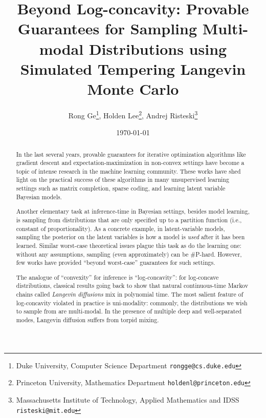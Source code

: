 \documentclass[11pt]{article}
\newcommand{\Hnote}[1]{}
\begin{document}
\title{Beyond Log-concavity: Provable Guarantees for Sampling Multi-modal Distributions using Simulated Tempering Langevin Monte Carlo}

\author{Rong Ge\thanks{Duke University, Computer Science Department \texttt{rongge@cs.duke.edu}}, Holden Lee\thanks{Princeton University, Mathematics Department \texttt{holdenl@princeton.edu}}, Andrej Risteski\thanks{Massachusetts Institute of Technology, Applied Mathematics and IDSS \texttt{risteski@mit.edu}}}

\date{\today}
\maketitle
\begin{abstract}
In the last several years, 
provable guarantees for iterative optimization algorithms like gradient descent and expectation-maximization in non-convex settings have become a topic of intense research 
in the machine learning community. These works have shed light on the practical success of these algorithms in many unsupervised learning settings such as matrix completion, sparse coding, and learning latent variable Bayesian models.

Another elementary task at inference-time in Bayesian settings, besides model learning, is sampling from distributions that are only specified up to a partition function (i.e., constant of proportionality). As a concrete example, in latent-variable models, sampling the posterior on the latent variables is how a model is \emph{used} after it has been learned. Similar worst-case theoretical issues plague this task as do the learning one: without any assumptions, sampling (even approximately) can be \#P-hard. However, few works have provided ``beyond worst-case'' guarantees for such settings.  


The analogue of ``convexity'' for inference is ``log-concavity'': for log-concave distributions, classical results going back to \cite{bakry1985diffusions} show that natural continuous-time Markov chains called \emph{Langevin diffusions} mix in polynomial time. The most salient feature of log-concavity violated in practice is uni-modality: commonly, the distributions we wish to sample from are multi-modal. In the presence of multiple deep and well-separated modes, Langevin diffusion suffers from torpid mixing.


\end{abstract}
\end{document}
